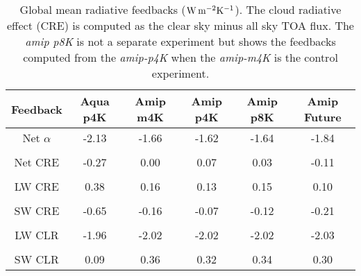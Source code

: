 \documentclass[draft]{agujournal2019}
\begin{document}
\begin{table}
\begin{center}
\caption{Global mean radiative feedbacks ($\rm{W\, m^{-2} K^{-1}}$).  The cloud radiative effect (CRE) is computed as
 the clear sky minus all sky TOA flux.   The \textit{amip p8K} is not a separate experiment but
shows the feedbacks computed from the \textit{amip-p4K} when the \textit{amip-m4K} is the control experiment.}
    \begin{tabular}{*{6}{c}}
    \hline
    \hline
 Feedback & Aqua p4K & Amip m4K & Amip p4K &  Amip p8K & Amip Future   \\ \hline
    Net  $\alpha$        &   -2.13      &  -1.66          &  -1.62         & -1.64           & -1.84           \\ 
    \\
    Net CRE   & -0.27       &  0.00              & 0.07         & 0.03         & -0.11            \\  
    \\
    LW CRE   & 0.38        &  0.16              & 0.13           & 0.15        & 0.10             \\  
    \\
    SW CRE  & -0.65     &  -0.16              & -0.07          & -0.12        & -0.21            \\  
    \\
    LW CLR   & -1.96       &  -2.02            & -2.02           & -2.02       & -2.03            \\  
    \\
    SW CLR  & 0.09        & 0.36              & 0.32             & 0.34        & 0.30             \\  \hline

    \end{tabular}\par
    \label{tab:lambda}
\end{center}
\end{table}
    
\end{document}
